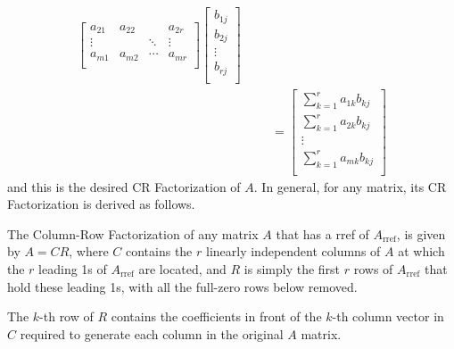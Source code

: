 {\begin{align*}
\begin{bmatrix}
a_{21} & a_{22} & & a_{2r} \\
\vdots & & \ddots & \vdots \\
a_{m1} & a_{m2} & \cdots & a_{mr} \\
\end{bmatrix}
\begin{bmatrix}
b_{1j} \\
b_{2j} \\
\vdots \\
b_{rj} \\
\end{bmatrix} \\
& & &=
\begin{bmatrix}
\sum_{k=1}^r a_{1k}b_{kj} \\
\sum_{k=1}^r a_{2k}b_{kj} \\
\vdots \\
\sum_{k=1}^r a_{mk}b_{kj} \\
\end{bmatrix} 
\end{align*}} and this is the desired CR Factorization of $A$. In general, for any matrix, its CR Factorization is derived as follows.
\begin{proper}[CR Factorization]
\label{proper:CRFactor}
The Column-Row Factorization of any matrix $A$ that has a rref of $A_{\text{rref}}$, is given by $A = CR$, where $C$ contains the $r$ linearly independent columns of $A$ at which the $r$ leading 1s of $A_{\text{rref}}$ are located, and $R$ is simply the first $r$ rows of $A_{\text{rref}}$ that hold these leading 1s, with all the full-zero rows below removed.
\end{proper}
The $k$-th row of $R$ contains the coefficients in front of the $k$-th column vector in $C$ required to generate each column in the original $A$ matrix.


